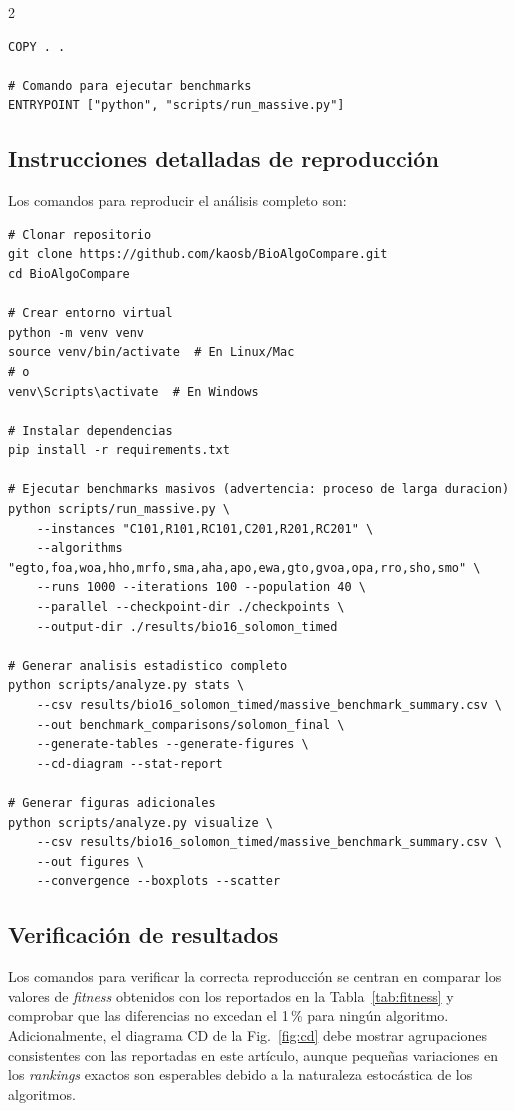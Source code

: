 \documentclass[10pt,a4paper]{extarticle}
\begin{document}
\begin{table}[!htbp]
\begin{multicols}{2}
\begin{lstlisting}
COPY . .

# Comando para ejecutar benchmarks
ENTRYPOINT ["python", "scripts/run_massive.py"]
\end{lstlisting}

\subsection{Instrucciones detalladas de reproducción}
Los comandos para reproducir el análisis completo son:
\begin{lstlisting}
# Clonar repositorio
git clone https://github.com/kaosb/BioAlgoCompare.git
cd BioAlgoCompare

# Crear entorno virtual
python -m venv venv
source venv/bin/activate  # En Linux/Mac
# o
venv\Scripts\activate  # En Windows

# Instalar dependencias
pip install -r requirements.txt

# Ejecutar benchmarks masivos (advertencia: proceso de larga duracion)
python scripts/run_massive.py \
    --instances "C101,R101,RC101,C201,R201,RC201" \
    --algorithms "egto,foa,woa,hho,mrfo,sma,aha,apo,ewa,gto,gvoa,opa,rro,sho,smo" \
    --runs 1000 --iterations 100 --population 40 \
    --parallel --checkpoint-dir ./checkpoints \
    --output-dir ./results/bio16_solomon_timed

# Generar analisis estadistico completo
python scripts/analyze.py stats \
    --csv results/bio16_solomon_timed/massive_benchmark_summary.csv \
    --out benchmark_comparisons/solomon_final \
    --generate-tables --generate-figures \
    --cd-diagram --stat-report

# Generar figuras adicionales
python scripts/analyze.py visualize \
    --csv results/bio16_solomon_timed/massive_benchmark_summary.csv \
    --out figures \
    --convergence --boxplots --scatter
\end{lstlisting}

\subsection{Verificación de resultados}
Los comandos para verificar la correcta reproducción se centran en comparar los valores de \textit{fitness} obtenidos con los reportados en la Tabla~\ref{tab:fitness} y comprobar que las diferencias no excedan el 1\,\% para ningún algoritmo. Adicionalmente, el diagrama CD de la Fig.~\ref{fig:cd} debe mostrar agrupaciones consistentes con las reportadas en este artículo, aunque pequeñas variaciones en los \textit{rankings} exactos son esperables debido a la naturaleza estocástica de los algoritmos.


\end{multicols}
\end{table}
\end{document}
